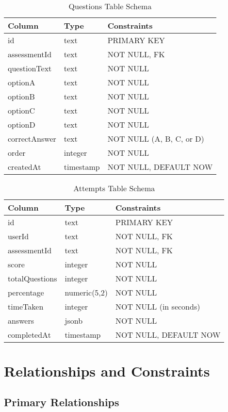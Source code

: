\documentclass[12pt,a4paper]{report}
\begin{document}
\begin{table}[H]
\centering
\caption{Questions Table Schema}
\begin{tabular}{@{}lll@{}}
\toprule
\textbf{Column} & \textbf{Type} & \textbf{Constraints} \\ \midrule
id & text & PRIMARY KEY \\
assessmentId & text & NOT NULL, FK \\
questionText & text & NOT NULL \\
optionA & text & NOT NULL \\
optionB & text & NOT NULL \\
optionC & text & NOT NULL \\
optionD & text & NOT NULL \\
correctAnswer & text & NOT NULL (A, B, C, or D) \\
order & integer & NOT NULL \\
createdAt & timestamp & NOT NULL, DEFAULT NOW \\ \bottomrule
\end{tabular}
\end{table}

\begin{table}[H]
\centering
\caption{Attempts Table Schema}
\begin{tabular}{@{}lll@{}}
\toprule
\textbf{Column} & \textbf{Type} & \textbf{Constraints} \\ \midrule
id & text & PRIMARY KEY \\
userId & text & NOT NULL, FK \\
assessmentId & text & NOT NULL, FK \\
score & integer & NOT NULL \\
totalQuestions & integer & NOT NULL \\
percentage & numeric(5,2) & NOT NULL \\
timeTaken & integer & NOT NULL (in seconds) \\
answers & jsonb & NOT NULL \\
completedAt & timestamp & NOT NULL, DEFAULT NOW \\ \bottomrule
\end{tabular}
\end{table}

\section{Relationships and Constraints}

\subsection{Primary Relationships}
\end{document}
